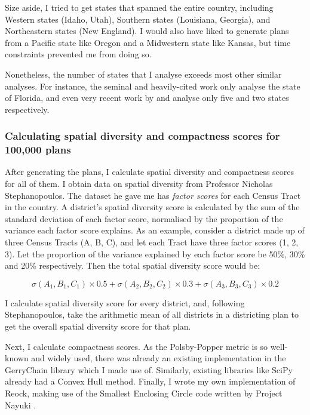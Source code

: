 \documentclass[]{article}
\begin{document}
Size aside, I tried to get states that spanned the entire country,
including Western states (Idaho, Utah), Southern states (Louisiana,
Georgia), and Northeastern states (New England). I would also have liked
to generate plans from a Pacific state like Oregon and a Midwestern
state like Kansas, but time constraints prevented me from doing so.

Nonetheless, the number of states that I analyse exceeds most other
similar analyses. For instance, the seminal and heavily-cited work
\cite{cr2013} only analyse the state of Florida, and even very recent
work by \cite{ddj2019recom} and \cite{s2020} analyse only five and two
states respectively.

\hypertarget{calculating-spatial-diversity-and-compactness-scores-for-100000-plans}{%
\subsubsection{Calculating spatial diversity and compactness scores for
100,000
plans}\label{calculating-spatial-diversity-and-compactness-scores-for-100000-plans}}

After generating the plans, I calculate spatial diversity and
compactness scores for all of them. I obtain data on spatial diversity
from Professor Nicholas Stephanopoulos. The dataset he gave me has
\emph{factor scores} for each Census Tract in the country. A district's
spatial diversity score is calculated by the sum of the standard
deviation of each factor score, normalised by the proportion of the
variance each factor score explains. As an example, consider a district
made up of three Census Tracts (A, B, C), and let each Tract have three
factor scores (1, 2, 3). Let the proportion of the variance explained by
each factor score be 50\%, 30\% and 20\% respectively. Then the total
spatial diversity score would be:

\[ \sigma(A_1, B_1, C_1) \times 0.5 + \sigma(A_2, B_2, C_2) \times 0.3 + \sigma(A_3,
B_3, C_3) \times 0.2\]

I calculate spatial diversity score for every district, and, following
Stephanopoulos, take the arithmetic mean of all districts in a
districting plan to get the overall spatial diversity score for that
plan.

Next, I calculate compactness scores. As the Polsby-Popper metric is so
well-known and widely used, there was already an existing implementation
in the GerryChain library which I made use of. Similarly, existing
libraries like SciPy already had a Convex Hull method. Finally, I wrote
my own implementation of Reock, making use of the Smallest Enclosing
Circle code written by Project Nayuki \citep{nayuki2020}.
\end{document}

